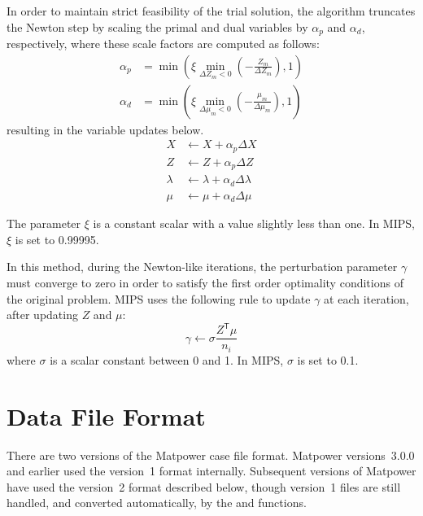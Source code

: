 \documentclass[12pt]{article}
\newcommand{\matpower}[0]{{\sc Matpower}}
\newcommand{\mips}[0]{{MIPS}}
\newcommand{\code}[1]{{\relsize{-0.5}{\tt{{#1}}}}}  %
\newcommand{\trans}[1]{{#1}^{\ensuremath{\mathsf{T}}}}  %
\numberwithin{equation}{section}
\numberwithin{table}{section}
\numberwithin{figure}{section}
\begin{document}
\begin{appendices}
In order to maintain strict feasibility of the trial solution, the algorithm truncates the Newton step by scaling the primal and dual variables by $\alpha_p$ and $\alpha_d$, respectively, where these scale factors are computed as follows:
\begin{align}
\alpha_p &= \min \left(\xi \min_{\Delta Z_m < 0} \left(-\frac{Z_m}{\Delta Z_m}\right), 1 \right)  \label{eq:alphap} \\
\alpha_d &= \min \left(\xi \min_{\Delta \mu_m < 0} \left(-\frac{\mu_m}{\Delta \mu_m}\right), 1 \right)  \label{eq:alphad}
\end{align}
resulting in the variable updates below.
\begin{align}
X &\gets X + \alpha_p \Delta X  \\
Z &\gets Z + \alpha_p \Delta Z  \\
\lambda &\gets \lambda + \alpha_d \Delta \lambda  \\
\mu &\gets \mu + \alpha_d \Delta \mu
\end{align}

The parameter $\xi$ is a constant scalar with a value slightly less than one. In \mips{}, $\xi$ is set to 0.99995.

In this method, during the Newton-like iterations, the perturbation parameter $\gamma$ must converge to zero in order to satisfy the first order optimality conditions of the original problem. \mips{} uses the following rule to update $\gamma$ at each iteration, after updating $Z$ and $\mu$:
\begin{equation}
\gamma \gets \sigma \frac{\trans{Z} \mu}{n_i} \label{eq:gamma}
\end{equation}
where $\sigma$ is a scalar constant between 0 and 1. In \mips{}, $\sigma$ is set to 0.1.


\clearpage
\section{Data File Format}
\label{app:caseformat}

There are two versions of the \matpower{} case file format. \matpower{} versions~3.0.0 and earlier used the version~1 format internally. Subsequent versions of \matpower{} have used the version~2 format described below, though version~1 files are still handled, and converted automatically, by the \code{loadcase} and \code{savecase} functions.


\end{appendices}
\end{document}

